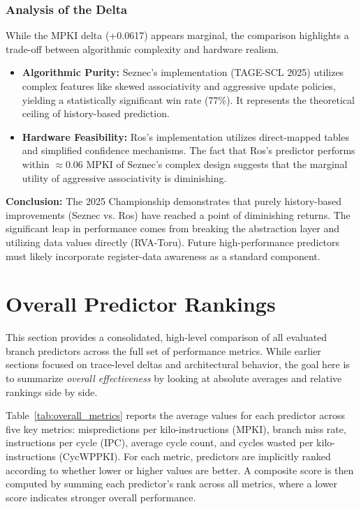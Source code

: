 \documentclass[11pt,a4paper]{article}
\begin{document}
\subsubsection{Analysis of the Delta}
While the MPKI delta (+0.0617) appears marginal, the comparison highlights a trade-off between algorithmic complexity and hardware realism.

\begin{itemize}
    \item \textbf{Algorithmic Purity:} Seznec's implementation (TAGE-SCL 2025) utilizes complex features like skewed associativity and aggressive update policies, yielding a statistically significant win rate (77\%). It represents the theoretical ceiling of history-based prediction.
    \item \textbf{Hardware Feasibility:} Ros's implementation utilizes direct-mapped tables and simplified confidence mechanisms. The fact that Ros's predictor performs within $\approx 0.06$ MPKI of Seznec's complex design suggests that the marginal utility of aggressive associativity is diminishing.
\end{itemize}

\textbf{Conclusion:} The 2025 Championship demonstrates that purely history-based improvements (Seznec vs. Ros) have reached a point of diminishing returns. The significant leap in performance comes from breaking the abstraction layer and utilizing data values directly (RVA-Toru). Future high-performance predictors must likely incorporate register-data awareness as a standard component.


\section{Overall Predictor Rankings}

This section provides a consolidated, high-level comparison of all evaluated branch predictors across the full set of performance metrics. While earlier sections focused on trace-level deltas and architectural behavior, the goal here is to summarize \textit{overall effectiveness} by looking at absolute averages and relative rankings side by side.

Table~\ref{tab:overall_metrics} reports the average values for each predictor across five key metrics: mispredictions per kilo-instructions (MPKI), branch miss rate, instructions per cycle (IPC), average cycle count, and cycles wasted per kilo-instructions (CycWPPKI). For each metric, predictors are implicitly ranked according to whether lower or higher values are better. A composite score is then computed by summing each predictor’s rank across all metrics, where a lower score indicates stronger overall performance.
\end{document}
